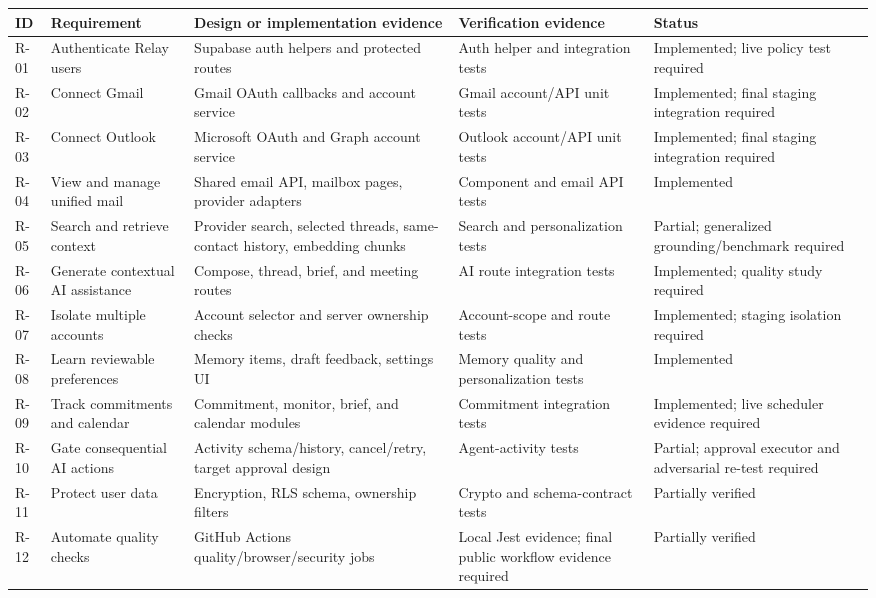 \documentclass[
]{report}
\begin{document}
\begin{longtable}[]{@{}p{}p{}p{}p{}p{}@{}}
\toprule\noalign{}
ID & Requirement & Design or implementation evidence & Verification
evidence & Status \\
\midrule\noalign{}
\endhead
\bottomrule\noalign{}
\endlastfoot
R-01 & Authenticate Relay users & Supabase auth helpers and protected
routes & Auth helper and integration tests & Implemented; live policy
test required \\
R-02 & Connect Gmail & Gmail OAuth callbacks and account service & Gmail
account/API unit tests & Implemented; final staging integration required \\
R-03 & Connect Outlook & Microsoft OAuth and Graph account service &
Outlook account/API unit tests & Implemented; final staging integration
required \\
R-04 & View and manage unified mail & Shared email API, mailbox pages,
provider adapters & Component and email API tests & Implemented \\
R-05 & Search and retrieve context & Provider search, selected threads,
same-contact history, embedding chunks & Search and personalization
tests & Partial; generalized grounding/benchmark required \\
R-06 & Generate contextual AI assistance & Compose, thread, brief, and
meeting routes & AI route integration tests & Implemented; quality study
required \\
R-07 & Isolate multiple accounts & Account selector and server ownership
checks & Account-scope and route tests & Implemented; staging isolation
required \\
R-08 & Learn reviewable preferences & Memory items, draft feedback,
settings UI & Memory quality and personalization tests & Implemented \\
R-09 & Track commitments and calendar & Commitment, monitor, brief, and
calendar modules & Commitment integration tests & Implemented; live
scheduler evidence required \\
R-10 & Gate consequential AI actions & Activity schema/history,
cancel/retry, target approval design & Agent-activity tests & Partial;
approval executor and adversarial re-test required \\
R-11 & Protect user data & Encryption, RLS schema, ownership filters &
Crypto and schema-contract tests & Partially verified \\
R-12 & Automate quality checks & GitHub Actions quality/browser/security
jobs & Local Jest evidence; final public workflow evidence required & Partially
verified \\
\end{longtable}
\end{document}
